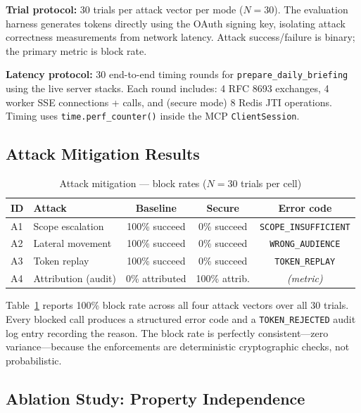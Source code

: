\documentclass[journal]{IEEEtran}
\begin{document}
\textbf{Trial protocol:} 30 trials per attack vector per mode ($N = 30$). The evaluation harness generates tokens directly using the OAuth signing key, isolating attack correctness measurements from network latency. Attack success/failure is binary; the primary metric is block rate.

\textbf{Latency protocol:} 30 end-to-end timing rounds for \texttt{prepare\_daily\_briefing} using the live server stacks. Each round includes: 4 RFC 8693 exchanges, 4 worker SSE connections + calls, and (secure mode) 8 Redis JTI operations. Timing uses \texttt{time.perf\_counter()} inside the MCP \texttt{ClientSession}.

\subsection{Attack Mitigation Results}

\begin{table}[h]
\caption{Attack mitigation — block rates ($N=30$ trials per cell)}
\label{tab:attacks_main}
\centering
\footnotesize
\setlength{\tabcolsep}{4pt}
\begin{tabular}{llccc}
\toprule
\textbf{ID} & \textbf{Attack} & \textbf{Baseline} & \textbf{Secure} & \textbf{Error code} \\
\midrule
A1 & Scope escalation    & 100\% succeed & 0\% succeed & \texttt{SCOPE\_INSUFFICIENT} \\
A2 & Lateral movement    & 100\% succeed & 0\% succeed & \texttt{WRONG\_AUDIENCE} \\
A3 & Token replay        & 100\% succeed & 0\% succeed & \texttt{TOKEN\_REPLAY} \\
A4 & Attribution (audit) & 0\% attributed & 100\% attrib. & \textit{(metric)} \\
\bottomrule
\end{tabular}
\end{table}

Table~\ref{tab:attacks_main} reports 100\% block rate across all four attack vectors over all 30 trials. Every blocked call produces a structured error code and a \texttt{TOKEN\_REJECTED} audit log entry recording the reason. The block rate is perfectly consistent—zero variance—because the enforcements are deterministic cryptographic checks, not probabilistic.

\subsection{Ablation Study: Property Independence}
\label{sec:ablation}
\end{document}
